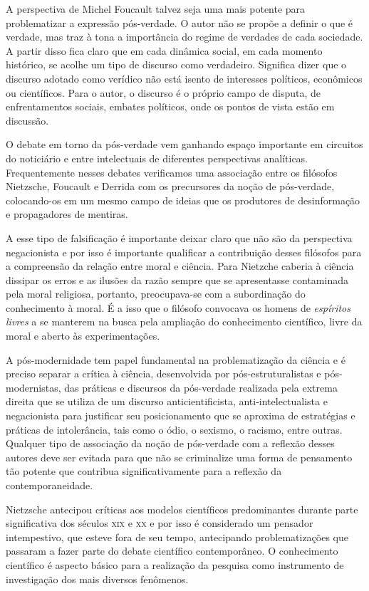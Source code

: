 A perspectiva de Michel Foucault talvez seja uma mais potente para
problematizar a expressão pós-verdade. O autor não se propõe a definir o
que é verdade, mas traz à tona a importância do regime de verdades de
cada sociedade. A partir disso fica claro que em cada dinâmica social,
em cada momento histórico, se acolhe um tipo de discurso como
verdadeiro. Significa dizer que o discurso adotado como verídico não
está isento de interesses políticos, econômicos ou científicos. Para o
autor, o discurso é o próprio campo de disputa, de enfrentamentos
sociais, embates políticos, onde os pontos de vista estão em discussão.

O debate em torno da pós-verdade vem ganhando espaço importante em
circuitos do noticiário e entre intelectuais de diferentes perspectivas
analíticas. Frequentemente nesses debates verificamos uma associação
entre os filósofos Nietzsche, Foucault e Derrida com os precursores da
noção de pós-verdade, colocando-os em um mesmo campo de ideias que os
produtores de desinformação e propagadores de mentiras.

A esse tipo de falsificação é importante deixar claro que não
são da perspectiva negacionista e por isso é importante qualificar a
contribuição desses filósofos para a compreensão da relação entre moral
e ciência. Para Nietzche caberia à ciência dissipar os erros e as
ilusões da razão sempre que se apresentasse contaminada pela moral
religiosa, portanto, preocupava-se com a subordinação do conhecimento à
moral. É a isso que o filósofo convocava os homens de \textit{espíritos
livres} a se manterem na busca pela ampliação do conhecimento
científico, livre da moral e aberto às experimentações.

A pós-modernidade tem papel fundamental na problematização da ciência e
é preciso separar a crítica à ciência, desenvolvida por
pós-estruturalistas e pós-modernistas, das práticas e discursos da
pós-verdade realizada pela extrema direita que se utiliza de um discurso
anticientificista, anti-intelectualista e negacionista para justificar
seu posicionamento que se aproxima de estratégias e práticas de
intolerância, tais como o ódio, o sexismo, o racismo, entre outras.
Qualquer tipo de associação da noção de pós-verdade com a reflexão
desses autores deve ser evitada para que não se criminalize uma forma de
pensamento tão potente que contribua significativamente para a reflexão
da contemporaneidade.

Nietzsche antecipou críticas aos modelos científicos
predominantes durante parte significativa dos séculos \textsc{xix} e \textsc{xx} e por
isso é considerado um pensador intempestivo, que esteve fora de seu
tempo, antecipando problematizações que passaram a fazer parte do debate
científico contemporâneo. O conhecimento científico é aspecto básico
para a realização da pesquisa como instrumento de investigação dos mais
diversos fenômenos.

